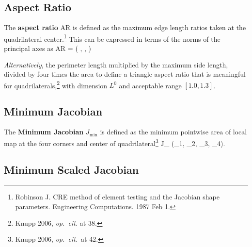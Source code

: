 \documentclass[14pt,letterpaper,fleqn]{extreport}
\begin{document}
\subsection{Aspect Ratio}

The {\bf aspect ratio} AR is defined as the maximum edge length ratios taken at the 
quadrilateral center.\footnote{Robinson J. CRE method 
of element testing and the Jacobian shape parameters. Engineering Computations. 
1987 Feb 1.}  
This can be expressed in terms of the norms of the principal axes as
\be 
\mbox{AR} = \max\left(
  \frac{\norm{\vX}}{\norm{\vY}}, 
  \frac{\norm{\vY}}{\norm{\vX}}, 
 \right)
\ee

{\em Alternatively}, the perimeter length multiplied by the maximum side length, 
divided by four times the area to define a triangle aspect ratio that is 
meaningful for quadrilaterals,\footnote{Knupp 2006, {\em op.~cit.} at 38.} with 
dimension $L^0$ and acceptable range $[1.0, 1.3]$.


\subsection{Minimum Jacobian}
The {\bf Minimum Jacobian} $J_{\min}$ is defined as the minimum pointwise area of local 
map at the four corners and center of quadrilateral\footnote{Knupp 2006, {\em op.~cit.}~at 42.}
\be 
J_{\min}  \min \left(\alpha_1, \alpha_2, \alpha_3, \alpha_4\right).
\ee 

\subsection{Minimum Scaled Jacobian}
\end{document}
